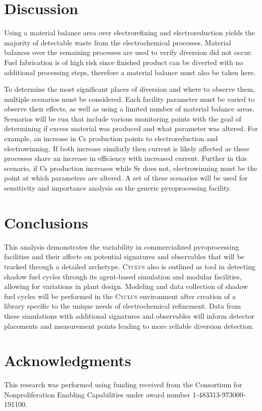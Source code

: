 \documentclass{anstrans}
\newcommand{\Cyclus}{\textsc{Cyclus}\xspace}%
\begin{document}
\section{Discussion}
Using a material balance area over electrorefining and electroreduction yields the majority of detectable waste from 
the electrochemical processes.  Material balances over the remaining 
processes are used to verify diversion did not occur.  Fuel fabrication is of high risk since finished product can be diverted with no additional 
processing steps, therefore a material balance must also be taken here. 

To determine the most significant places of diversion and where to observe them, multiple scenarios must be considered. 
Each facility parameter must be varied to observe their effects, as well as using a limited number of material balance areas. 
Scenarios will be run that include various monitoring points with the goal of determining if excess material was produced 
and what parameter was altered. For example, an increase in Cs production points to electroreduction and electrowinning. 
If both increase similarly then current is likely affected as these processes share an increase in efficiency with increased 
current. Further in this scenario, if Cs production increases while Sr does not, electrowinning must be the point at which 
parameters are altered. A set of these scenarios will be used for sensitivity and importance analysis on the generic 
pyroprocessing facility.

\section{Conclusions}
This analysis demonstrates the variability in commercialized pyroprocessing facilities and their affects on potential 
signatures and observables that will be tracked through a detailed archetype. \Cyclus also is outlined as tool in 
detecting shadow fuel cycles through its agent-based simulation and modular facilities, allowing for variations in 
plant design. Modeling and data collection of shadow fuel cycles will be performed in the \Cyclus environment after 
creation of a library specific to the unique needs of electrochemical refinement. Data from these simulations with 
additional signatures and observables will inform detector placements and measurement points leading to more 
reliable diversion detection.

\section{Acknowledgments}
This research was performed using funding received from the Consortium for Nonproliferation Enabling Capabilities under award number 1-483313-973000-191100.



\end{document}
